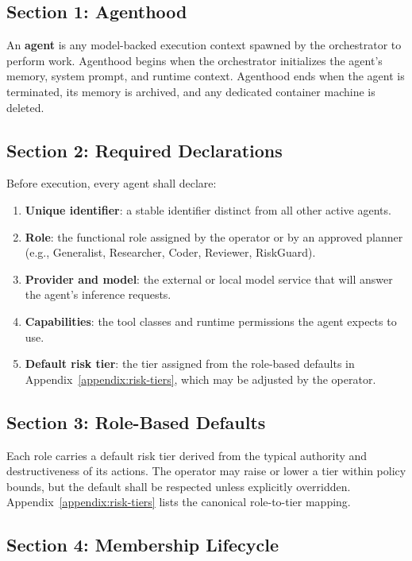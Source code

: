 \documentclass[12pt,letterpaper]{article}
\begin{document}
\subsection{Section 1: Agenthood}

An \textbf{agent} is any model-backed execution context spawned by the orchestrator to perform work. Agenthood begins when the orchestrator initializes the agent's memory, system prompt, and runtime context. Agenthood ends when the agent is terminated, its memory is archived, and any dedicated container machine is deleted.

\subsection{Section 2: Required Declarations}

Before execution, every agent shall declare:

\begin{enumerate}
    \item \textbf{Unique identifier}: a stable identifier distinct from all other active agents.
    \item \textbf{Role}: the functional role assigned by the operator or by an approved planner (e.g., Generalist, Researcher, Coder, Reviewer, RiskGuard).
    \item \textbf{Provider and model}: the external or local model service that will answer the agent's inference requests.
    \item \textbf{Capabilities}: the tool classes and runtime permissions the agent expects to use.
    \item \textbf{Default risk tier}: the tier assigned from the role-based defaults in Appendix~\ref{appendix:risk-tiers}, which may be adjusted by the operator.
\end{enumerate}

\subsection{Section 3: Role-Based Defaults}

Each role carries a default risk tier derived from the typical authority and destructiveness of its actions. The operator may raise or lower a tier within policy bounds, but the default shall be respected unless explicitly overridden. Appendix~\ref{appendix:risk-tiers} lists the canonical role-to-tier mapping.

\subsection{Section 4: Membership Lifecycle}
\end{document}
